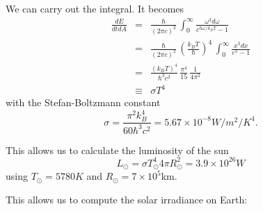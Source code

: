 \documentclass[11pt]{book}
\def\be{\begin{equation}}
\def\ee{\end{equation}}
\def\bea{\begin{eqnarray}}
\def\eea{\end{eqnarray}}
\newcommand{\vs}{\nonumber\\}
\begin{document}
\item We can carry out the integral. It becomes
\bea
\frac{dE}{dtdA} &=&  \frac{\hbar}{(2\pi c)^2}\, \int_0^\infty   \frac{\omega^3d\omega}{e^{\hbar\omega/k_BT}-1}
\vs
&=&
  \frac{\hbar}{(2\pi c)^2}\, \left(\frac{k_BT}{\hbar}\right)^4\,\int_0^\infty \frac{x^3 dx}{e^x-1}
  \vs
  &=& 
  \frac{(k_BT)^4}{\hbar^3c^2}\, \frac{\pi^4}{15}\,\frac1{4\pi^2}
  \vs
&  \equiv& \sigma T^4
\eea
with the Stefan-Boltzmann constant
\be
\sigma = \frac{\pi^2 k_B^4}{60\hbar^3c^2} = 5.67\times 10^{-8} W/m^2/K^4.\ee
\item This allows us to calculate the luminosity of the sun
\be
L_\odot = \sigma T_\odot^4 4\pi R_\odot^2 = 3.9\times 10^{26} W
\ee
using $T_\odot=5780K$ and $R_\odot=7\times 10^5$km.
\item This allows us to compute the solar irradiance on Earth:
\end{document}
